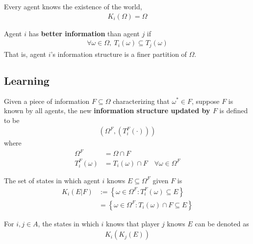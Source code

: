 \documentclass{article}
\begin{document}
   	\begin{theorem}
   		Every agent knows the existence of the world,
   		\begin{align}
   			K_i(\Omega) = \Omega
   		\end{align}
   	\end{theorem}
   	
   	\begin{definition}
   		Agent $i$ has \textbf{better information} than agent $j$ if
   		\begin{align}
   			\forall \omega \in \Omega,\ T_i(\omega) \subseteq T_j(\omega)
   		\end{align}
   		That is, agent $i$'s information structure is a finer partition of $\Omega$.
   	\end{definition}
   	
   	\subsection{Learning}
   	\begin{definition}
   		Given a piece of information $F \subseteq \Omega$ characterizing that $\omega^* \in F$, suppose $F$ is known by all agents,
   		the new \textbf{information structure updated by $F$} is defined to be
   		\begin{align}
   			(\Omega^F, (T^F_i(\cdot)))
   		\end{align}
   		where
   		\begin{align}
   			\Omega^F &= \Omega \cap F \\
   			T_i^F(\omega) &= T_i(\omega) \cap F\quad \forall \omega \in \Omega^F
   		\end{align}
   	\end{definition}
   	\begin{definition}
   		The set of states in which agent $i$ knows $E \subseteq \Omega^F$ given $F$ is 
   		\begin{align}
   			K_i(E|F) &:= \left\{
   			\omega \in \Omega^F: T_i^F(\omega) \subseteq E
   			\right\} \\
   			&= \left\{
   			\omega \in \Omega^F: T_i(\omega) \cap F \subseteq E
   			\right\}
   		\end{align}
   	\end{definition}
   	
   	\begin{notation}
   		For $i, j \in A$, the states in which $i$ knows that player $j$ knows $E$ can be denoted as
   		\begin{align}
   			K_i(K_j(E))
   		\end{align}
   	\end{notation}
   	
\end{document}
